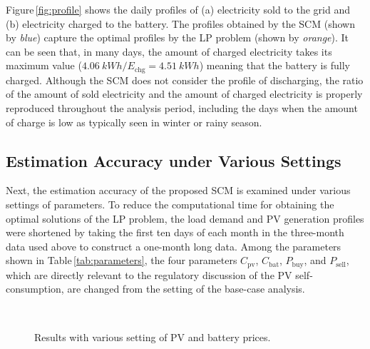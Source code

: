 \documentclass[lettersize,journal]{IEEEtran}
\newcommand{\figref}[1]{Fig.\,\ref{#1}}
\newcommand{\Figref}[1]{Figure\,\ref{#1}}
\newcommand{\tabref}[1]{Table\,\ref{#1}}
\begin{document}

\Figref{fig:profile} shows the daily profiles of (a) electricity sold to the grid and (b) electricity charged to the battery.  
The profiles obtained by the SCM (shown by \emph{blue}) capture the optimal profiles by the LP problem (shown by \emph{orange}). 
It can be seen that, in many days, the amount of charged electricity takes its maximum value ($\SI{4.06}{kWh}/E_\mathrm{chg}=\SI{4.51}{kWh}$) meaning that the battery is fully charged. 
Although the SCM does not consider the profile of discharging, the ratio of the amount of sold electricity and the amount of charged electricity is properly reproduced throughout the analysis period, including the days when the amount of charge is low as typically seen in winter or rainy season. 



\subsection{Estimation Accuracy under Various Settings}

Next, the estimation accuracy of the proposed SCM is examined under various settings of parameters. 
To reduce the computational time for obtaining the optimal solutions of the LP problem, the load demand and PV generation profiles were shortened by taking the first ten days of each month in the three-month data used above to construct a one-month long data.
Among the parameters shown in \tabref{tab:parameters}, the four parameters $C_\mathrm{pv}$, $C_\mathrm{bat}$, $P_\mathrm{buy}$, and $P_\mathrm{sell}$, which are directly relevant to the regulatory discussion of the PV self-consumption, are changed from the setting of the base-case analysis.  


\begin{figure}[!t]
 \centering
 \\[2mm]
 \caption{Results with various setting of PV and battery prices. } \label{fig:diff_fixed_costs}
\end{figure}
\end{document}

